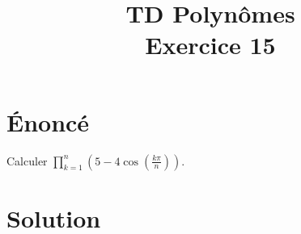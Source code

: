 \documentclass[french]{article}
\title{TD Polynômes \\ Exercice 15}
\date{}
\begin{document}
\maketitle

\section{Énoncé}
Calculer $\displaystyle\prod_{k=1}^{n}\left(5-4\cos\left(\frac{k\pi}{n}\right)\right)$.
\section{Solution}
\end{document}
